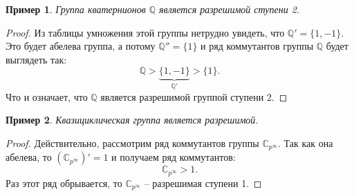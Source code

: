 \documentclass{article}
\newtheorem{example}{Пример}[section]
\begin{document}
\begin{example}
    Группа кватернионов $\mathbb{Q}$ является разрешимой ступени 2.
\end{example}
\begin{proof}
    Из таблицы умножения этой группы нетрудно увидеть, что $\mathbb{Q}' = \{ 1, -1 \}$. Это будет абелева группа, а потому $\mathbb{Q}'' = \{ 1 \}$ и ряд коммутантов группы $\mathbb{Q}$ будет выглядеть так:
    \[
        \mathbb{Q} > \underbrace{\{ 1, -1 \}}_{\mathbb{Q}'} > \{ 1 \}.
    \]
    Что и означает, что $\mathbb{Q}$ является разрешимой группой ступени 2.
\end{proof}

\begin{example}
    Квазициклическая группа является разрешимой.
\end{example}
\begin{proof}
    Действительно, рассмотрим ряд коммутантов группы $\mathbb{C}_{p^\infty}$. Так как она абелева, то $(\mathbb{C}_{p^\infty})' = 1$ и получаем ряд коммутантов: $$ \mathbb{C}_{p^\infty} > 1. $$ Раз этот ряд обрывается, то $\mathbb{C}_{p^\infty}$ -- разрешимая ступени 1. 
\end{proof}
\end{document}
